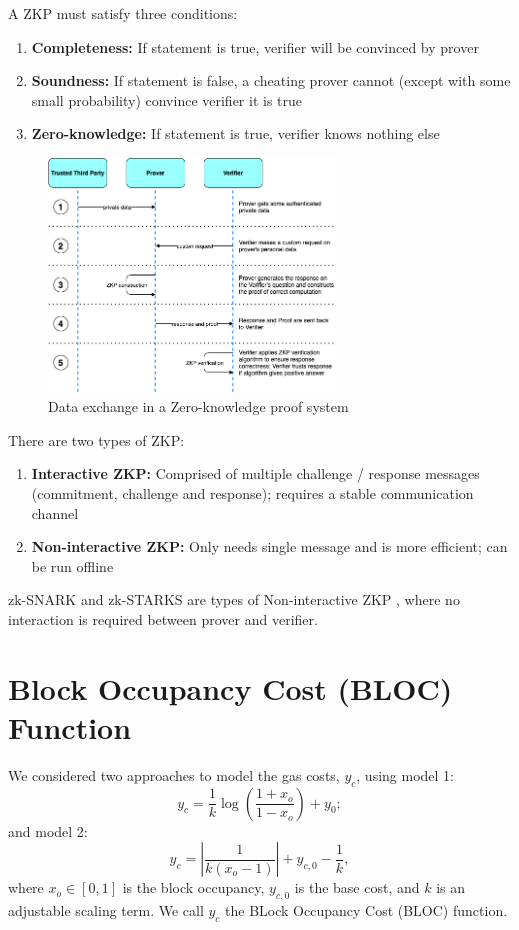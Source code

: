 \documentclass[peerreview]{ieeesyscoin}
\begin{document}
A ZKP must satisfy three conditions:

\begin{enumerate}
\item \textbf{Completeness:} If statement is true, verifier will be convinced by prover
\item\textbf{Soundness:} If statement is false, a cheating prover cannot (except with some small probability) convince verifier it is true
\item \textbf{Zero-knowledge:} If statement is true, verifier knows nothing else
\end{enumerate}

\begin{figure}[h!]
\includegraphics[width=3in]{img/zkp.png}
\caption{Data exchange in a Zero-knowledge proof system} 
\label{fig:zkp}
\end{figure} 

There are two types of ZKP:

\begin{enumerate}
\item \textbf{Interactive ZKP:} Comprised of multiple challenge / response messages (commitment, challenge and response); requires a stable communication channel
\item \textbf{Non-interactive ZKP:} Only needs single message and is more efficient; can be run offline
\end{enumerate}
zk-SNARK and zk-STARKS are types of Non-interactive ZKP , where no interaction is required between prover and verifier.

\section{Block Occupancy Cost (BLOC) Function}

We considered two approaches to model the gas costs, $y_{c}$, using model 1:
\begin{equation}
y_{c} = \dfrac{1}{k}\log\left(\dfrac{1+x_{o}}{1-x_{o}}\right) + y_{0};
\end{equation}
and model 2:
\begin{equation}
y_{c} = \left| \dfrac{1}{k(x_{o}-1)} \right| + y_{c,0} - \dfrac{1}{k},
\end{equation}
where $x_{o} \in [0,1]$ is the block occupancy, $y_{c,0}$ is the base cost, and $k$ is an adjustable scaling term. We call $y_{c}$ the BLock Occupancy Cost (BLOC) function.
\end{document}
